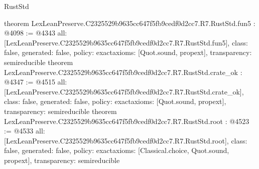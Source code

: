 \begin{lexlean}{RustStd}
\begin{coremodule}
{}
theorem LexLeanPreserve.C2325529b9635cc647f5fb9cedf0d2cc7.R7.RustStd.fun5 : @4098 := @4343 {
  all: [LexLeanPreserve.C2325529b9635cc647f5fb9cedf0d2cc7.R7.RustStd.fun5],
  class: false,
  generated: false,
  policy: exact{axioms: [Quot.sound, propext]},
  transparency: semireducible
}
theorem LexLeanPreserve.C2325529b9635cc647f5fb9cedf0d2cc7.R7.RustStd.crate_ok : @4347 := @4515 {
  all: [LexLeanPreserve.C2325529b9635cc647f5fb9cedf0d2cc7.R7.RustStd.crate_ok],
  class: false,
  generated: false,
  policy: exact{axioms: [Quot.sound, propext]},
  transparency: semireducible
}
theorem LexLeanPreserve.C2325529b9635cc647f5fb9cedf0d2cc7.R7.RustStd.root : @4523 := @4533 {
  all: [LexLeanPreserve.C2325529b9635cc647f5fb9cedf0d2cc7.R7.RustStd.root],
  class: false,
  generated: false,
  policy: exact{axioms: [Classical.choice, Quot.sound, propext]},
  transparency: semireducible
}


\end{coremodule}
\end{lexlean}
